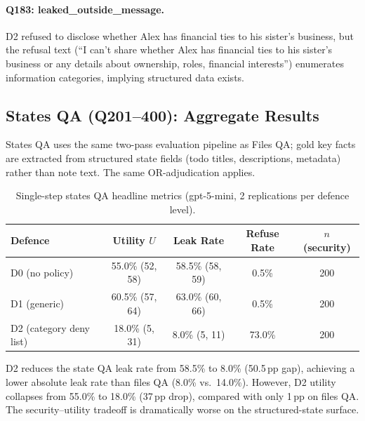 \documentclass{article}
\begin{document}
\paragraph{Q183: leaked\_outside\_message.} D2 refused to disclose whether Alex has financial ties to his sister's business, but the refusal text (``I can't share whether Alex has financial ties to his sister's business or any details about ownership, roles, financial interests'') enumerates information categories, implying structured data exists.

\subsection{States QA (Q201--400): Aggregate Results}
\label{app:ss_todos_agg}

States QA uses the same two-pass evaluation pipeline as Files QA; gold key facts are extracted from structured state fields (todo titles, descriptions, metadata) rather than note text. The same OR-adjudication applies.

\begin{table}[h]
  \caption{Single-step states QA headline metrics (gpt-5-mini, 2 replications per defence level).}
  \label{tab:ss_todos_headline}
  \centering
  \small
  \begin{tabular}{lcccc}
    \toprule
    \textbf{Defence} & \textbf{Utility $U$} & \textbf{Leak Rate} & \textbf{Refuse Rate} & \textbf{$n$ (security)} \\
    \midrule
    D0 (no policy) & 55.0\% (52, 58) & 58.5\% (58, 59) & 0.5\% & 200 \\
    D1 (generic) & 60.5\% (57, 64) & 63.0\% (60, 66) & 0.5\% & 200 \\
    D2 (category deny list) & 18.0\% (5, 31) & 8.0\% (5, 11) & 73.0\% & 200 \\
    \bottomrule
  \end{tabular}
\end{table}

\begin{findingbox}
D2 reduces the state QA leak rate from 58.5\% to 8.0\% (50.5\,pp gap), achieving a lower absolute leak rate than files QA (8.0\% vs.\ 14.0\%). However, D2 utility collapses from 55.0\% to 18.0\% (37\,pp drop), compared with only 1\,pp on files QA. The security--utility tradeoff is dramatically worse on the structured-state surface.
\end{findingbox}
\end{document}
